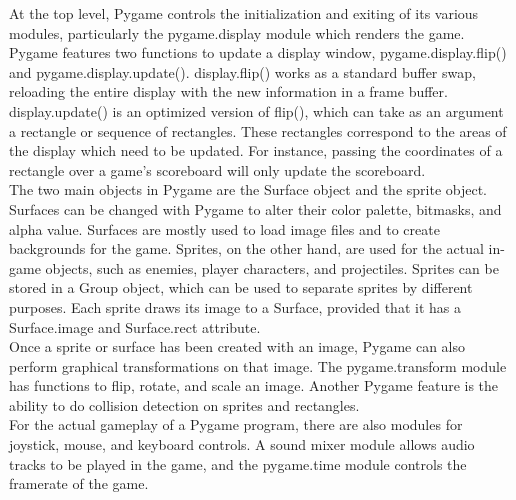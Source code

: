 At the top level, Pygame controls the initialization and exiting of its various modules, particularly the pygame.display module which renders the game. Pygame features two functions to update a display window, pygame.display.flip() and pygame.display.update(). display.flip() works as a standard buffer swap, reloading the entire display with the new information in a frame buffer. display.update() is an optimized version of flip(), which can take as an argument a rectangle or sequence of rectangles. These rectangles correspond to the areas of the display which need to be updated. For instance, passing the coordinates of a rectangle over a game's scoreboard will only update the scoreboard.\\

The two main objects in Pygame are the Surface object and the sprite object. Surfaces can be changed with Pygame to alter their color palette, bitmasks, and alpha value. Surfaces are mostly used to load image files and to create backgrounds for the game. Sprites, on the other hand, are used for the actual in-game objects, such as enemies, player characters, and projectiles. Sprites can be stored in a Group object, which can be used to separate sprites by different purposes. Each sprite draws its image to a Surface, provided that it has a Surface.image and Surface.rect attribute.\\

Once a sprite or surface has been created with an image, Pygame can also perform graphical transformations on that image. The pygame.transform module has functions to flip, rotate, and scale an image. Another Pygame feature is the ability to do collision detection on sprites and rectangles.\\

For the actual gameplay of a Pygame program, there are also modules for joystick, mouse, and keyboard controls. A sound mixer module allows audio tracks to be played in the game, and the pygame.time module controls the framerate of the game.